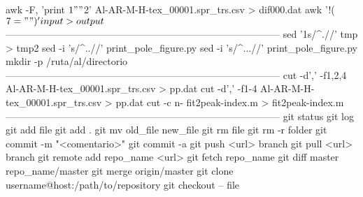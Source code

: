 awk -F, '{print $1 " " $2}' Al-AR-M-H-tex_00001.spr_trs.csv > dif000.dat
awk '!($7=" ")' input > output
$
------------------------------------------------------------------------------------
sed '1s/^.//' tmp > tmp2
sed -i 's/^..//' print_pole_figure.py
sed -i 's/^...//' print_pole_figure.py
mkdir -p /ruta/al/directorio
------------------------------------------------------------------------------------
cut -d',' -f1,2,4 Al-AR-M-H-tex_00001.spr_trs.csv > pp.dat
cut -d',' -f1-4 Al-AR-M-H-tex_00001.spr_trs.csv > pp.dat
cut -c n- fit2peak-index.m > fit2peak-index.m
------------------------------------------------------------------------------------
git status
git log
git add file
git add .
git mv old_file new_file
git rm file
git rm -r folder
git commit -m "<comentario>"
git commit -a
git push <url> branch
git pull <url> branch
git remote add repo_name <url>
git fetch repo_name
git diff master repo_name/master
git merge origin/master
git clone username@host:/path/to/repository
git checkout -- file
